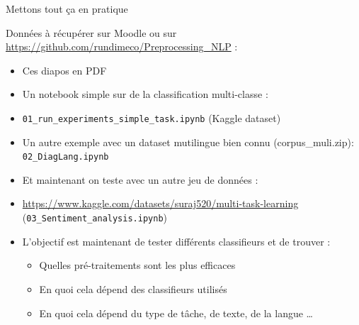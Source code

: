 \begin{frame}{Mettons tout ça en pratique}


	\small{
Données à récupérer sur Moodle ou sur 
\url{https://github.com/rundimeco/Preprocessing_NLP} :

	\begin{itemize}
\item Ces diapos en  PDF
\item Un notebook simple sur de la classification multi-classe :
\item	\texttt{01\_run\_experiments\_simple\_task.ipynb} (Kaggle dataset)
\item Un autre exemple avec un dataset mutilingue bien connu (corpus\_muli.zip):
 \texttt{02\_DiagLang.ipynb}
\item Et maintenant on teste avec un autre jeu de données :
\item \small{\url{https://www.kaggle.com/datasets/suraj520/multi-task-learning}} (\texttt{03\_Sentiment\_analysis.ipynb})
\item L'objectif est maintenant de tester différents classifieurs et de trouver :
	\begin{itemize}
\item Quelles pré-traitements sont les plus efficaces
\item En quoi cela dépend des classifieurs utilisés
\item En quoi cela dépend du type de tâche, de texte, de la langue \dots
\end{itemize}

\end{itemize}
	}
\end{frame}
